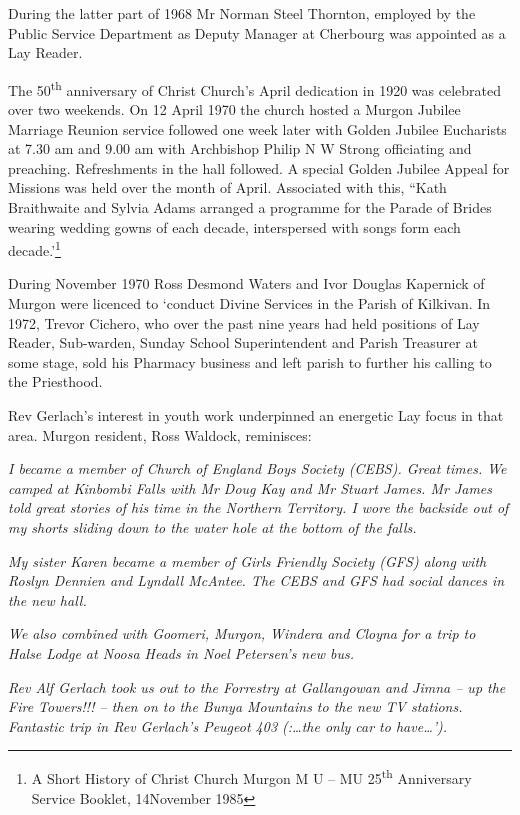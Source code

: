 During the latter part of 1968 Mr Norman Steel Thornton, employed by the Public Service Department as Deputy Manager at Cherbourg was appointed as a Lay Reader.

The 50\textsuperscript{th} anniversary of Christ Church's April dedication in 1920 was celebrated over two weekends. On 12 April 1970 the church hosted a Murgon Jubilee Marriage Reunion service followed one week later with Golden Jubilee Eucharists at 7.30 am and 9.00 am with Archbishop Philip N W Strong officiating and preaching. Refreshments in the hall followed. A special Golden Jubilee Appeal for Missions was held over the month of April. Associated with this, ``Kath Braithwaite and Sylvia Adams arranged a programme for the Parade of Brides wearing wedding gowns of each decade, interspersed with songs form each decade.'\footnote{A Short History of Christ Church Murgon M U -- MU 25\textsuperscript{th} Anniversary Service Booklet, 14November 1985}

During November 1970 Ross Desmond Waters and Ivor Douglas Kapernick of Murgon were licenced to `conduct Divine Services in the Parish of Kilkivan. In 1972, Trevor Cichero, who over the past nine years had held positions of Lay Reader, Sub-warden, Sunday School Superintendent and Parish Treasurer at some stage, sold his Pharmacy business and left parish to further his calling to the Priesthood.

Rev Gerlach's interest in youth work underpinned an energetic Lay focus in that area. Murgon resident, Ross Waldock, reminisces:

\emph{I became a member of Church of England Boys Society (CEBS). Great times. We camped at Kinbombi Falls with Mr Doug Kay and Mr Stuart James. Mr James told great stories of his time in the Northern Territory. I wore the backside out of my shorts sliding down to the water hole at the bottom of the falls.}

\emph{My sister Karen became a member of Girls Friendly Society (GFS) along with Roslyn Dennien and Lyndall McAntee. The CEBS and GFS had social dances in the new hall.}

\emph{We also combined with Goomeri, Murgon, Windera and Cloyna for a trip to Halse Lodge at Noosa Heads in Noel Petersen's new bus.}

\emph{Rev Alf Gerlach took us out to the Forrestry at Gallangowan and Jimna -- up the Fire Towers!!! -- then on to the Bunya Mountains to the new TV stations. Fantastic trip in Rev Gerlach's Peugeot 403 (:\ldots the only car to have\ldots').}

